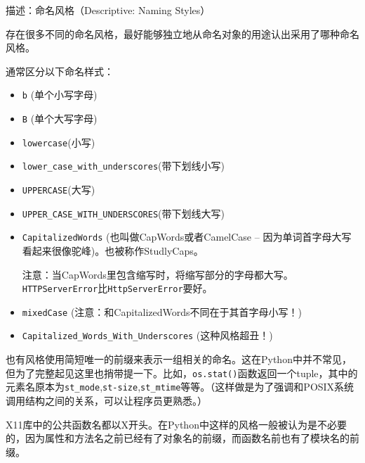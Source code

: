 \documentclass[ignorenonframetext,9pt]{beamer}
\begin{document}
\begin{frame}[fragile]

\begin{block}{描述：命名风格（Descriptive: Naming Styles）}

存在很多不同的命名风格，最好能够独立地从命名对象的用途认出采用了哪种命名风格。

通常区分以下命名样式：

\begin{itemize}
\item
  \texttt{b} (单个小写字母)
\item
  \texttt{B} (单个大写字母)
\item
  \texttt{lowercase}(小写)
\item
  \texttt{lower\_case\_with\_underscores}(带下划线小写)
\item
  \texttt{UPPERCASE}(大写)
\item
  \texttt{UPPER\_CASE\_WITH\_UNDERSCORES}(带下划线大写)
\item
  \texttt{CapitalizedWords} (也叫做CapWords或者CamelCase --
  因为单词首字母大写看起来很像驼峰)。也被称作StudlyCaps。

  注意：当CapWords里包含缩写时，将缩写部分的字母都大写。\texttt{HTTPServerError}比\texttt{HttpServerError}要好。
\item
  \texttt{mixedCase} (注意：和CapitalizedWords不同在于其首字母小写！)
\item
  \texttt{Capitalized\_Words\_With\_Underscores} (这种风格超丑！)
\end{itemize}

\end{block}

\end{frame}

\begin{frame}[fragile]

也有风格使用简短唯一的前缀来表示一组相关的命名。这在Python中并不常见，但为了完整起见这里也捎带提一下。比如，\texttt{os.stat()}函数返回一个tuple，其中的元素名原本为\texttt{st\_mode},\texttt{st-size},\texttt{st\_mtime}等等。（这样做是为了强调和POSIX系统调用结构之间的关系，可以让程序员更熟悉。）

X11库中的公共函数名都以X开头。在Python中这样的风格一般被认为是不必要的，因为属性和方法名之前已经有了对象名的前缀，而函数名前也有了模块名的前缀。

\end{frame}
\end{document}
